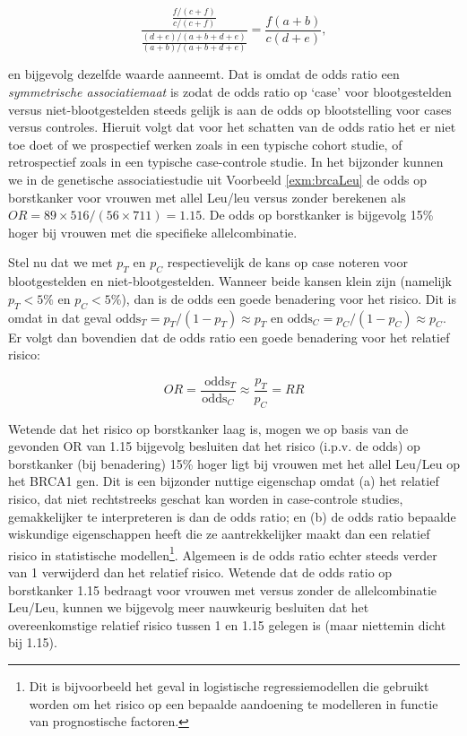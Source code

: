\documentclass[
  12pt,dutch,coursenotes]{book}
\begin{document}
\begin{equation*}
\frac{ \frac{ f/(c+f)}{c/(c+f)} }{ \frac{(d+e)/(a+b+d+e)}{(a+b)/(a+b+d+e)}} = \frac{f(a+b)}{c(d+e)},
\end{equation*}

en bijgevolg dezelfde waarde aanneemt. Dat is omdat de odds ratio een
\emph{symmetrische associatiemaat} is zodat de odds ratio op `case' voor
blootgestelden versus niet-blootgestelden steeds gelijk is aan de odds op
blootstelling voor cases versus controles. Hieruit volgt dat voor het
schatten van de odds ratio het er niet toe doet of we prospectief werken
zoals in een typische cohort studie, of retrospectief zoals in een typische
case-controle studie. In het bijzonder kunnen we in de genetische associatiestudie uit
Voorbeeld \ref{exm:brcaLeu} de odds op borstkanker voor vrouwen met allel Leu/leu
versus zonder berekenen als \(OR=89\times 516/(56\times 711)=1.15\).
De odds op borstkanker is bijgevolg 15\% hoger bij vrouwen met die specifieke allelcombinatie.

Stel nu dat we met \(p_T\) en \(p_C\) respectievelijk de kans op case noteren
voor blootgestelden en niet-blootgestelden. Wanneer beide kansen klein zijn
(namelijk \(p_T<5\%\) en \(p_C<5\%\)), dan is de odds een goede benadering voor
het risico. Dit is omdat in dat geval \(\mbox{odds}_T=p_T/(1-p_T)\approx p_T\) en \(\mbox{odds}_C=p_C/(1-p_C)\approx p_C\). Er volgt dan bovendien dat de odds ratio
een goede benadering voor het relatief risico:

\begin{equation*}
OR=\frac{\mbox{ odds}_T}{\mbox{
odds}_C}\approx \frac{p_T}{p_C}=RR
\end{equation*}

Wetende dat het risico op borstkanker laag is, mogen we
op basis van de gevonden OR van 1.15 bijgevolg
besluiten dat het risico (i.p.v. de odds) op borstkanker (bij benadering) 15\% hoger ligt bij vrouwen met het allel Leu/Leu op het BRCA1 gen. Dit is een bijzonder
nuttige eigenschap omdat (a) het relatief risico, dat niet rechtstreeks
geschat kan worden in case-controle studies, gemakkelijker te interpreteren
is dan de odds ratio; en (b) de odds ratio bepaalde wiskundige eigenschappen
heeft die ze aantrekkelijker maakt dan een relatief risico in statistische
modellen\footnote{Dit is bijvoorbeeld het geval in logistische regressiemodellen die gebruikt worden om het
  risico op een bepaalde aandoening te modelleren in functie van prognostische
  factoren.}. Algemeen is de odds ratio echter steeds verder van 1 verwijderd
dan het relatief risico. Wetende dat de odds ratio op borstkanker 1.15
bedraagt voor vrouwen met versus zonder de allelcombinatie Leu/Leu, kunnen we bijgevolg meer
nauwkeurig besluiten dat het overeenkomstige relatief risico tussen 1 en 1.15
gelegen is (maar niettemin dicht bij 1.15).
\end{document}
